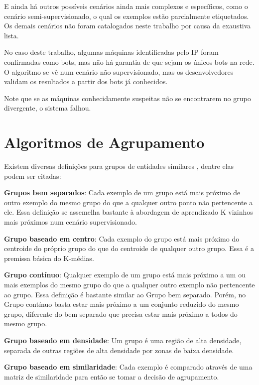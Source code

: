 E ainda há outros possíveis cenários ainda mais complexos e específicos, como o cenário semi-supervisionado, o qual os exemplos estão parcialmente etiquetados. Os demais cenários não foram catalogados neste trabalho por causa da exaustiva lista.

No caso deste trabalho, algumas máquinas identificadas pelo IP foram confirmadas como bots, mas não há garantia de que sejam os únicos bots na rede. O algoritmo se vê num cenário não supervisionado, mas os desenvolvedores validam os resultados a partir dos bots já conhecidos.

Note que se as máquinas conhecidamente suspeitas não se encontrarem no grupo divergente, o sistema falhou.

\section{Algoritmos de Agrupamento}

Existem diversas definições para grupos de entidades similares \citep{faceli2011inteligencia}, dentre elas podem ser citadas:
\begin{description}
\item \textbf{Grupos bem separados}: Cada exemplo de um grupo está mais próximo de outro exemplo do mesmo grupo do que a qualquer outro ponto não pertencente a ele. Essa definição se assemelha bastante à abordagem de aprendizado K vizinhos mais próximos num cenário supervisionado.
\item \textbf{Grupo baseado em centro}: Cada exemplo do grupo está mais próximo do centroide do próprio grupo do que do centroide de qualquer outro grupo. Essa é a premissa básica do K-médias.
\item \textbf{Grupo contínuo}: Qualquer exemplo de um grupo está mais próximo a um ou mais exemplos do mesmo grupo do que a qualquer outro exemplo não pertencente ao grupo. Essa definição é bastante similar ao Grupo bem separado. Porém, no Grupo contínuo basta estar mais próximo a um conjunto reduzido do mesmo grupo, diferente do bem separado que precisa estar mais próximo a todos do mesmo grupo.
\item \textbf{Grupo baseado em densidade}: Um grupo é uma região de alta densidade, separada de outras regiões de alta densidade por zonas de baixa densidade.
\item \textbf{Grupo baseado em similaridade}: Cada exemplo é comparado através de uma matriz de similaridade para então se tomar a decisão de agrupamento.
\end{description}

